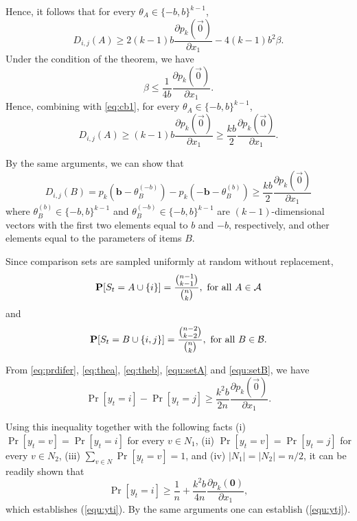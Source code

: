 Hence, it follows that for every $\theta_{A}\in \{-b,b\}^{k-1}$, 
\begin{equation}
D_{i,j}(A) \geq 2(k-1)b \frac{\partial p_k (\vec{0})}{\partial x_1} - 
 4(k-1)b^2\beta.
\label{eq:cb1}
\end{equation}
Under the condition of the theorem, we have
$$
\beta \le \frac{1}{4b}\frac{\partial p_k (\vec{0})}{\partial x_1}.
$$
Hence, combining with \eqref{eq:cb1}, for every $\theta_{A}\in \{-b,b\}^{k-1}$,
\begin{equation}
D_{i,j}(A) \geq (k-1)b \frac{\partial p_k (\vec{0})}{\partial x_1} \geq  \frac{kb}{2} \frac{\partial p_k (\vec{0})}{\partial x_1}. 
\label{eq:thea}
\end{equation}

By the same arguments, we can show that 
\begin{equation}
D_{i,j}(B) = p_k ({\bm b}-\theta^{(-b)}_{B})- p_k (-{\bm b}-\theta^{(b)}_{B}) \geq \frac{kb}{2} \frac{\partial p_k (\vec{0})}{\partial x_1}
\label{eq:theb}
\end{equation}
where $\theta^{(b)}_{B}\in \{-b,b \}^{k-1}$ and $\theta^{(-b)}_{B}\in \{-b,b \}^{k-1}$ are $(k-1)$-dimensional vectors with the first two elements equal to $b$ and $-b$, respectively, and other elements equal to the parameters of items $B$. 

Since comparison sets are sampled uniformly at random without replacement, 
\begin{equation}
\Pr[S_t = A\cup \{i\}] = \frac{\binom{n-1}{k-1}}{\binom{n}{k}}, \hbox{ for all } A \in {\mathcal A}
\label{equ:setA}
\end{equation}
and
\begin{equation}
\Pr[S_t = B\cup \{i,j\}] = \frac{\binom{n-2}{k-2}}{\binom{n}{k}}, \hbox{ for all } B \in {\mathcal B}.
\label{equ:setB}
\end{equation}

From \eqref{eq:prdifer}, \eqref{eq:thea}, \eqref{eq:theb}, \eqref{equ:setA} and \eqref{equ:setB}, we have
$$
\Pr[ y_t = i ] - \Pr[ y_t = j ] \ge  \frac{k^2b}{2n} \frac{\partial p_k (\vec{0})}{\partial x_1}.
$$

Using this inequality together with the following facts (i) $\Pr[y_t = v] = \Pr[y_t = i]$ for every $v\in N_1$, (ii) $\Pr[y_t = v] = \Pr[y_t = j]$ for every $v\in N_2$, (iii) $\sum_{v\in N} \Pr[y_t = v] = 1$, and (iv) $|N_1| = |N_2| = n/2$, it can be readily shown that
$$
\Pr[ y_t = i ] \ge \frac{1}{n} + \frac{k^2b}{4n} \frac{\partial p_k ({\bm 0})}{\partial x_1},
$$
which establishes (\ref{equ:yti}). By the same arguments one can establish (\ref{equ:ytj}).

